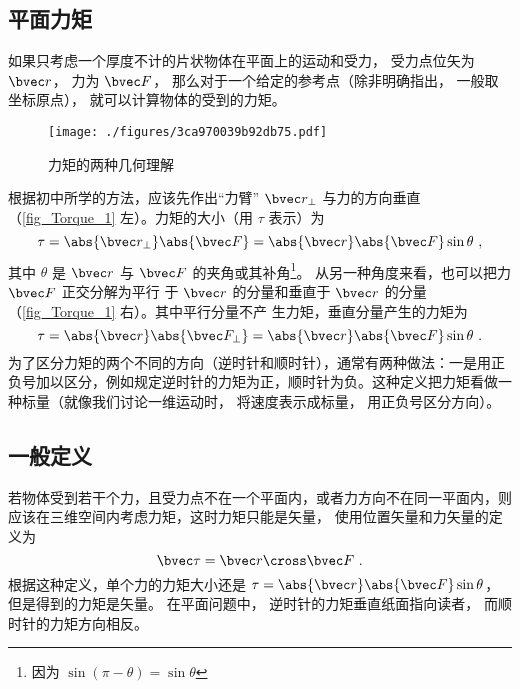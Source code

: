

\subsection{平面力矩}

如果只考虑一个厚度不计的片状物体在平面上的运动和受力， 受力点位矢为 $\bvec r$， 力为 $\bvec F$， 那么对于一个给定的参考点（除非明确指出， 一般取坐标原点）， 就可以计算物体的受到的力矩。

\begin{figure}[ht]
\centering
\texttt{[image: ./figures/3ca970039b92db75.pdf]}
\caption{力矩的两种几何理解}\label{fig_Torque_1}
\end{figure}

根据初中所学的方法，应该先作出“力臂” $\bvec r_ \bot$ 与力的方向垂直（\autoref{fig_Torque_1} 左）。力矩的大小（用 $\tau$ 表示）为
\begin{equation}\label{eq_Torque_2}
\tau = \abs{\bvec r_ \bot } \abs{\bvec F} = \abs{\bvec r} \abs{\bvec F} \sin \theta ~,
\end{equation}
其中 $\theta $ 是 $\bvec r$ 与 $\bvec F$ 的夹角或其补角\footnote{因为 $\sin(\pi - \theta) = \sin\theta$}。 从另一种角度来看，也可以把力 $\bvec F$ 正交分解为平行
于 $\bvec r$ 的分量和垂直于 $\bvec r$ 的分量（\autoref{fig_Torque_1} 右）。其中平行分量不产
生力矩，垂直分量产生的力矩为
\begin{equation}\label{eq_Torque_1}
\tau = \abs{\bvec r} \abs{\bvec F_ \bot } = \abs{\bvec r} \abs{\bvec F} \sin \theta ~.
\end{equation}
为了区分力矩的两个不同的方向（逆时针和顺时针），通常有两种做法：一是用正负号加以区分，例如规定逆时针的力矩为正，顺时针为负。这种定义把力矩看做一种标量（就像我们讨论一维运动时， 将速度表示成标量， 用正负号区分方向）。

\subsection{一般定义}
若物体受到若干个力，且受力点不在一个平面内，或者力方向不在同一平面内，则应该在三维空间内考虑力矩，这时力矩只能是矢量， 使用位置矢量和力矢量的定义为
\begin{equation}\label{eq_Torque_3}
\bvec \tau = \bvec r \cross \bvec F~.
\end{equation}
根据这种定义，单个力的力矩大小还是 $\tau = \abs{\bvec r} \abs{\bvec F}\sin \theta$， 但是得到的力矩是矢量。 在平面问题中， 逆时针的力矩垂直纸面指向读者， 而顺时针的力矩方向相反。

